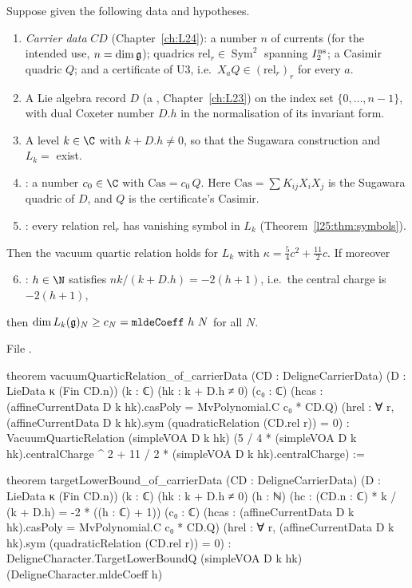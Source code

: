 \begin{theorem}\label{l25:thm:carrierdata}
Suppose given the following data and hypotheses.
\begin{enumerate}
\item \emph{Carrier data} $CD$ (Chapter~\ref{ch:L24}): a number $n$ of currents (for the intended use,
  $n=\dim\mathfrak g$); quadrics $\mathrm{rel}_r\in\operatorname{Sym}^2$ spanning $I_2^{\rm ns}$; a Casimir quadric $Q$;
  and a certificate of U3, i.e.\ $X_aQ\in(\mathrm{rel}_r)_r$ for every $a$.
\item A Lie algebra record $D$ (a , Chapter~\ref{ch:L23}) on the index set $\{0,\dots,n-1\}$, with dual
  Coxeter number $D.h$ in the normalisation of its invariant form.
\item A level $k\in\C$ with $k+D.h\ne0$, so that the Sugawara construction and $L_k=$ exist.
\item {}: a number $c_0\in\C$ with $\mathrm{Cas}=c_0\,Q$. Here $\mathrm{Cas}=\sum K_{ij}X_iX_j$ is the Sugawara
  quadric of $D$, and $Q$ is the certificate's Casimir.
\item {}: every relation $\mathrm{rel}_r$ has vanishing symbol in $L_k$ (Theorem~\ref{l25:thm:symbols}).
\end{enumerate}
Then the vacuum quartic relation holds for $L_k$ with $\kappa=\frac54c^2+\frac{11}2c$. If moreover
\begin{enumerate}\setcounter{enumi}{5}
\item {}: $h\in\N$ satisfies $nk/(k+D.h)=-2(h+1)$, i.e.\ the central charge is $-2(h+1)$,
\end{enumerate}
then $\dim L_k(\mathfrak g)_N\ge c_N=\mathtt{mldeCoeff}\ h\ N$ for all $N$.
\end{theorem}
\noindent File .
\begin{leancode}
theorem vacuumQuarticRelation_of_carrierData (CD : DeligneCarrierData) (D : LieData κ (Fin CD.n))
    (k : ℂ) (hk : k + D.h ≠ 0) (c₀ : ℂ)
    (hcas : (affineCurrentData D k hk).casPoly = MvPolynomial.C c₀ * CD.Q)
    (hrel : ∀ r, (affineCurrentData D k hk).sym (quadraticRelation (CD.rel r)) = 0) :
    VacuumQuarticRelation (simpleVOA D k hk)
      (5 / 4 * (simpleVOA D k hk).centralCharge ^ 2 + 11 / 2 * (simpleVOA D k hk).centralCharge) :=

theorem targetLowerBound_of_carrierData (CD : DeligneCarrierData) (D : LieData κ (Fin CD.n))
    (k : ℂ) (hk : k + D.h ≠ 0) (h : ℕ)
    (hc : (CD.n : ℂ) * k / (k + D.h) = -2 * ((h : ℂ) + 1)) (c₀ : ℂ)
    (hcas : (affineCurrentData D k hk).casPoly = MvPolynomial.C c₀ * CD.Q)
    (hrel : ∀ r, (affineCurrentData D k hk).sym (quadraticRelation (CD.rel r)) = 0) :
    DeligneCharacter.TargetLowerBoundQ (simpleVOA D k hk) (DeligneCharacter.mldeCoeff h)
\end{leancode}
